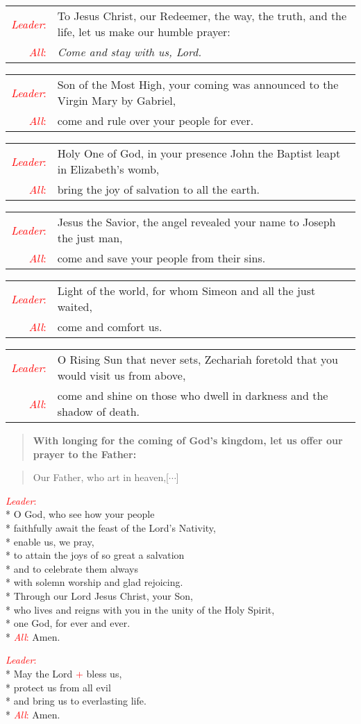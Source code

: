 \documentclass[letterpaper,14pt]{extarticle}
\newcommand{\side}[1]{\flagverse{\textcolor{red}{\textit{#1}}:}}
\newcommand{\sidestar}[1]{\textcolor{red}{\textit{#1}:}}
\newcommand{\rednote}[1]{\textcolor{red}{#1}}
\newlength{\oldindent}
\newcommand{\antiphon}[2]{
	\setlength{\oldindent}{\vindent}
	\setlength{\vindent}{0em}
	\begin{verse}
	\side{#1} \textbf{#2}
	\end{verse}
	\setlength{\vindent}{\oldindent}
}
\newcommand{\intercession}[2]{
	\begin{tabular}[h]{r p{4.25in}}
		\sidestar{Leader} & #1 \\
		\sidestar{All} & #2
	\end{tabular}}
\begin{document}
\intercession{To Jesus Christ, our Redeemer, the way, the truth, and the life, let us make our humble prayer:}
{\textit{Come and stay with us, Lord.}}

\intercession{Son of the Most High, your coming was announced to the Virgin Mary by Gabriel,}
{come and rule over your people for ever.}

\intercession{Holy One of God, in your presence John the Baptist leapt in Elizabeth’s womb,}
{bring the joy of salvation to all the earth.}

\intercession{Jesus the Savior, the angel revealed your name to Joseph the just man,}
{come and save your people from their sins.}

\intercession{Light of the world, for whom Simeon and all the just waited,}
{come and comfort us.}

\intercession{O Rising Sun that never sets, Zechariah foretold that you would visit us from above,}
{come and shine on those who dwell in darkness and the shadow of death. }

\antiphon{Leader}{With longing for the coming of God’s kingdom, let us offer our prayer to the Father:}
	
\begin{verse}
	\side{All} Our Father, who art in heaven,[$\cdots$] \\
\end{verse}


\sidestar{Leader}\\*
O God, who see how your people\\*
faithfully await the feast of the Lord’s Nativity,\\*
enable us, we pray,\\*
to attain the joys of so great a salvation\\*
and to celebrate them always\\*
with solemn worship and glad rejoicing.\\*
Through our Lord Jesus Christ, your Son,\\*
who lives and reigns with you in the unity of the Holy Spirit,\\*
one God, for ever and ever.\\*
\sidestar{All} Amen.


\sidestar{Leader}\\*
May the Lord \rednote{+} bless us, \\*
protect us from all evil \\*
and bring us to everlasting life. \\*
\sidestar{All} Amen.
\end{document}
